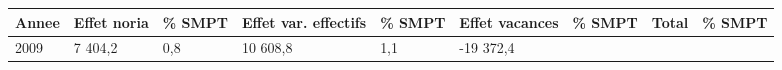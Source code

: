 \begin{longtable}[]{@{}lllllllll@{}}
\toprule
\begin{minipage}[b]{0.05\columnwidth}\raggedright
Annee\strut
\end{minipage} & \begin{minipage}[b]{0.10\columnwidth}\raggedright
Effet noria\strut
\end{minipage} & \begin{minipage}[b]{0.06\columnwidth}\raggedright
\% SMPT\strut
\end{minipage} & \begin{minipage}[b]{0.16\columnwidth}\raggedright
Effet var. effectifs\strut
\end{minipage} & \begin{minipage}[b]{0.06\columnwidth}\raggedright
\% SMPT\strut
\end{minipage} & \begin{minipage}[b]{0.12\columnwidth}\raggedright
Effet vacances\strut
\end{minipage} & \begin{minipage}[b]{0.06\columnwidth}\raggedright
\% SMPT\strut
\end{minipage} & \begin{minipage}[b]{0.09\columnwidth}\raggedright
Total\strut
\end{minipage} & \begin{minipage}[b]{0.06\columnwidth}\raggedright
\% SMPT\strut
\end{minipage}\tabularnewline
\midrule
\endhead
\begin{minipage}[t]{0.05\columnwidth}\raggedright
2009\strut
\end{minipage} & \begin{minipage}[t]{0.10\columnwidth}\raggedright
7 404,2\strut
\end{minipage} & \begin{minipage}[t]{0.06\columnwidth}\raggedright
0,8\strut
\end{minipage} & \begin{minipage}[t]{0.16\columnwidth}\raggedright
10 608,8\strut
\end{minipage} & \begin{minipage}[t]{0.06\columnwidth}\raggedright
1,1\strut
\end{minipage} & \begin{minipage}[t]{0.12\columnwidth}\raggedright
-19 372,4\strut
\end{minipage} & \begin{minipage}[t]{0.06\columnwidth}\raggedright

\end{minipage}
\end{longtable}
